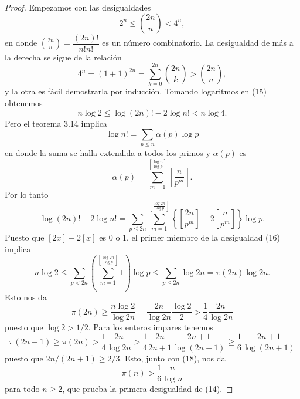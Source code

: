\documentclass[12pt,a4paper]{book}
\begin{document}
    \begin{proof}
        Empezamos con las desigualdades
        \begin{equation}
            2^n\leq\binom{2n}{n}<4^n,
        \end{equation}
        en donde $\binom{2n}{n}=\dfrac{(2n)!}{n!n!}$ es un número combinatorio. La
        desigualdad de más a la derecha se sigue de la relación
        \begin{equation*}
            4^n=(1+1)^{2n}=\sum_{k=0}^{2n}\binom{2n}{k}>\binom{2n}{n},
        \end{equation*}
        y la otra es fácil demostrarla por inducción. Tomando logaritmos en (15)
        obtenemos
        \begin{equation}
            n\log2\leq\log(2n)!-2\log n!<n\log4.
        \end{equation}
        Pero el teorema 3.14 implica
        \begin{equation*}
            \log n!=\sum_{p\leq n}\alpha(p)\log p
        \end{equation*}
        en donde la suma se halla extendida a todos los primos y $\alpha(p)$ es
        \begin{equation*}
            \alpha(p)=\sum_{m=1}^{\left[\frac{\log n}{\log p}\right]}\left[\frac{n}{p^m}\right].
        \end{equation*}
        Por lo tanto
        \begin{equation}
            \log(2n)!-2\log n!=\sum_{p\leq2n}\sum_{m=1}^{\left[\frac{\log2n}{\log p}\right]}
            \left\{\left[\frac{2n}{p^m}\right]-2\left[\frac{n}{p^m}\right]\right\}\log p.
        \end{equation}
        Puesto que $[2x]-2[x]$ es 0 o 1, el primer miembro de la desigualdad (16)
        implica
        \begin{equation*}
            n\log2\leq\sum_{p<2n}\left(\sum_{m=1}^{\left[\frac{\log2n}{\log p}\right]}1\right)\log p
            \leq\sum_{p\leq2n}\log2n=\pi(2n)\log2n.
        \end{equation*}
        Esto nos da
        \begin{equation}
            \pi(2n)\geq\frac{n\log2}{\log2n}=\frac{2n}{\log2n}\frac{\log2}{2}
            >\frac{1}{4}\frac{2n}{\log2n}
        \end{equation}
        puesto que $\log2>1/2$. Para los enteros impares tenemos
        \begin{equation*}
            \pi(2n+1)\geq\pi(2n)>\frac{1}{4}\frac{2n}{\log2n}>\frac{1}{4}\frac{2n}{2n+1}
            \frac{2n+1}{\log(2n+1)}\geq\frac{1}{6}\frac{2n+1}{\log(2n+1)}
        \end{equation*}
        puesto que $2n/(2n+1)\geq2/3$. Esto, junto con (18), nos da
        \begin{equation*}
            \pi(n)>\frac{1}{6}\frac{n}{\log n}
        \end{equation*}
        para todo $n\geq2$, que prueba la primera desigualdad de (14).


\end{proof}
\end{document}
